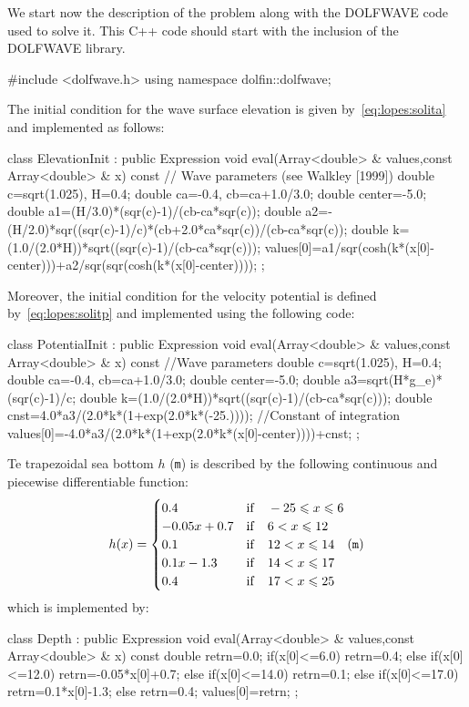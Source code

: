 We start now the description of the problem along with the DOLFWAVE
code used to solve it. This C++ code should start with the inclusion
of the DOLFWAVE library.
\begin{c++}
#include <dolfwave.h>
using namespace dolfin::dolfwave;
\end{c++}
The initial condition for the wave surface elevation is
given by~\eqref{eq:lopes:solita} and implemented as follows:
\begin{c++}
class ElevationInit : public Expression
{
  void eval(Array<double> & values,const Array<double> & x) const
  { // Wave parameters (see Walkley [1999])
    double c=sqrt(1.025), H=0.4;
    double ca=-0.4, cb=ca+1.0/3.0;
    double center=-5.0;
    double a1=(H/3.0)*(sqr(c)-1)/(cb-ca*sqr(c));
    double a2=-(H/2.0)*sqr((sqr(c)-1)/c)*(cb+2.0*ca*sqr(c))/(cb-ca*sqr(c));
    double k=(1.0/(2.0*H))*sqrt((sqr(c)-1)/(cb-ca*sqr(c)));
    values[0]=a1/sqr(cosh(k*(x[0]-center)))+a2/sqr(sqr(cosh(k*(x[0]-center))));
  }
};
\end{c++}
Moreover, the initial condition for the velocity potential is defined
by~\eqref{eq:lopes:solitp} and implemented using the following code:
\begin{c++}
class PotentialInit :  public Expression
{
  void eval(Array<double> & values,const Array<double> & x) const
  { //Wave parameters
    double c=sqrt(1.025), H=0.4;
    double ca=-0.4, cb=ca+1.0/3.0;
    double center=-5.0;
    double a3=sqrt(H*g_e)*(sqr(c)-1)/c;
    double k=(1.0/(2.0*H))*sqrt((sqr(c)-1)/(cb-ca*sqr(c)));
    double cnst=4.0*a3/(2.0*k*(1+exp(2.0*k*(-25.)))); //Constant of integration
    values[0]=-4.0*a3/(2.0*k*(1+exp(2.0*k*(x[0]-center))))+cnst;
  }
};
\end{c++}

Te trapezoidal sea bottom $h$ ({\tt m}) is described by the following
continuous and piecewise differentiable function:
\begin{equation}
  \label{eq:lopes:piecewisebottom}
  h(x)=\begin{cases}
    0.4& {\rm if}\quad -25 \leqslant x\leqslant 6\\
    -0.05x+0.7& {\rm if}\quad 6< x\leqslant 12\\
    0.1& {\rm if}\quad 12< x\leqslant 14\\
    0.1x-1.3& {\rm if}\quad 14< x\leqslant 17\\
    0.4& {\rm if}\quad 17< x\leqslant 25
  \end{cases}  ({\tt m})
\end{equation}
which is implemented by:
\begin{c++}
class Depth :  public Expression
{
  void eval(Array<double> & values,const Array<double> & x) const
  {
    double retrn=0.0;
    if(x[0]<=6.0)
      retrn=0.4;
    else if(x[0]<=12.0)
      retrn=-0.05*x[0]+0.7;
    else if(x[0]<=14.0)
      retrn=0.1;
    else if(x[0]<=17.0)
      retrn=0.1*x[0]-1.3;
    else retrn=0.4;
    values[0]=retrn;
  }
};
\end{c++}

